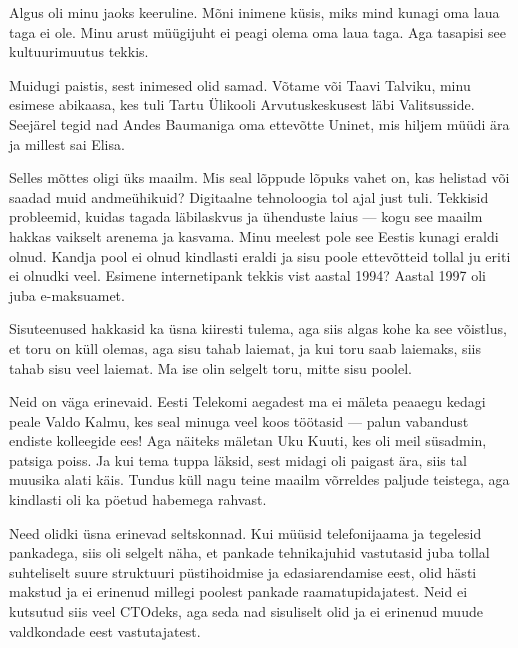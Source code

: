 Algus oli minu jaoks keeruline. Mõni inimene küsis, miks mind kunagi 
oma laua taga ei ole. Minu arust müügijuht ei peagi olema oma laua taga. Aga tasapisi see kultuurimuutus tekkis.


Muidugi paistis, sest inimesed olid samad. Võtame või Taavi 
Talviku, minu esimese abikaasa, kes tuli Tartu 
Ülikooli Arvutuskeskusest läbi 
Valitsusside. Seejärel tegid nad Andes 
Baumaniga oma ettevõtte Uninet, mis hiljem müüdi ära ja millest sai 
Elisa. 

Selles mõttes oligi üks maailm. Mis seal lõppude lõpuks vahet on, kas helistad või saadad muid 
andmeühikuid? Digitaalne tehnoloogia tol ajal just tuli. Tekkisid 
probleemid, kuidas tagada läbilaskvus ja ühenduste laius --- kogu see maailm 
hakkas vaikselt arenema ja kasvama. Minu meelest 
pole see Eestis kunagi eraldi olnud. Kandja pool ei olnud kindlasti eraldi ja sisu 
poole ettevõtteid tollal ju eriti ei olnudki veel. Esimene internetipank tekkis vist aastal 1994? Aastal 1997 oli juba e-maksuamet.

Sisuteenused hakkasid ka üsna kiiresti tulema, aga siis algas kohe ka see 
võistlus, et toru on küll olemas, aga sisu tahab laiemat, ja kui toru saab laiemaks, siis tahab sisu 
veel laiemat. Ma ise olin selgelt toru, mitte sisu poolel.


Neid on väga erinevaid. Eesti Telekomi aegadest ma ei mäleta peaaegu kedagi 
peale Valdo Kalmu, kes seal minuga veel koos töötasid ---
palun vabandust endiste kolleegide ees! Aga näiteks mäletan Uku 
Kuuti, kes oli meil süsadmin, patsiga poiss. Ja 
kui tema tuppa läksid, sest midagi oli paigast ära, siis tal muusika alati käis. 
Tundus küll nagu teine maailm võrreldes paljude teistega, aga kindlasti 
oli ka pöetud habemega rahvast.

Need olidki üsna erinevad seltskonnad. Kui müüsid telefonijaama ja tegelesid 
pankadega, siis oli selgelt näha, et pankade tehnikajuhid vastutasid juba 
tollal suhteliselt suure struktuuri püstihoidmise ja edasiarendamise 
eest, olid hästi makstud ja ei erinenud millegi poolest pankade
raamatupidajatest. Neid ei kutsutud siis veel CTOdeks, aga seda nad sisuliselt 
olid ja ei erinenud muude valdkondade eest vastutajatest. 

